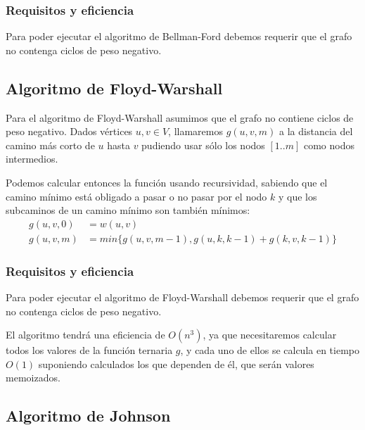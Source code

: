 \documentclass[a4paper, 11pt]{article} %
\begin{document}
    \subsubsection{Requisitos y eficiencia}
      Para poder ejecutar el algoritmo de Bellman-Ford debemos requerir que el grafo
      no contenga ciclos de peso negativo.
      
      
      
  \subsection{Algoritmo de Floyd-Warshall}
    Para el algoritmo de Floyd-Warshall asumimos que el grafo no contiene ciclos de peso negativo.
    Dados vértices $u,v \in V$, llamaremos $g(u,v,m)$ a la distancia del camino más corto de $u$
    hasta $v$ pudiendo usar sólo los nodos $[1..m]$ como nodos intermedios.
    
    Podemos calcular entonces la función usando recursividad, sabiendo que el
    camino mínimo está obligado a pasar o no pasar por el nodo $k$ y que los
    subcaminos de un camino mínimo son también mínimos:
    \begin{equation}
      \begin{split}
      g(u,v,0) &= w(u,v) \\
      g(u,v,m) &= min\{g(u,v,m-1), g(u,k,k-1)+g(k,v,k-1)\}
      \end{split}
    \end{equation}
    
    \subsubsection{Requisitos y eficiencia}
      Para poder ejecutar el algoritmo de Floyd-Warshall debemos requerir que el grafo
      no contenga ciclos de peso negativo.
      
      El algoritmo tendrá una eficiencia de $O(n^3)$, ya que necesitaremos calcular
      todos los valores de la función ternaria $g$, y cada uno de ellos se calcula
      en tiempo $O(1)$ suponiendo calculados los que dependen de él, que serán valores
      memoizados.
  
  \subsection{Algoritmo de Johnson}
\end{document}
